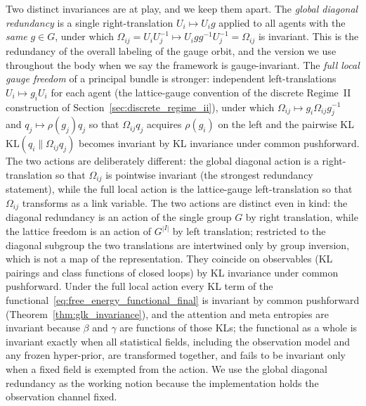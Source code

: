 \documentclass[11pt]{article}
\begin{document}
Two distinct invariances are at play, and we keep them apart. The \emph{global diagonal redundancy} is a single right-translation $U_i \mapsto U_i g$ applied to all agents with the \emph{same} $g \in G$, under which $\Omega_{ij} = U_i U_j^{-1} \mapsto U_i g g^{-1} U_j^{-1} = \Omega_{ij}$ is invariant. This is the redundancy of the overall labeling of the gauge orbit, and the version we use throughout the body when we say the framework is gauge-invariant. The \emph{full local gauge freedom} of a principal bundle is stronger: independent left-translations $U_i \mapsto g_i U_i$ for each agent (the lattice-gauge convention of the discrete Regime~II construction of Section~\ref{sec:discrete_regime_ii}), under which $\Omega_{ij} \mapsto g_i \Omega_{ij} g_j^{-1}$ and $q_j \mapsto \rho(g_j) q_j$ so that $\Omega_{ij} q_j$ acquires $\rho(g_i)$ on the left and the pairwise KL $\mathrm{KL}(q_i \| \Omega_{ij} q_j)$ becomes invariant by KL invariance under common pushforward. The two actions are deliberately different: the global diagonal action is a right-translation so that $\Omega_{ij}$ is pointwise invariant (the strongest redundancy statement), while the full local action is the lattice-gauge left-translation so that $\Omega_{ij}$ transforms as a link variable. The two actions are distinct even in kind: the diagonal redundancy is an action of the single group $G$ by right translation, while the lattice freedom is an action of $G^{|I|}$ by left translation; restricted to the diagonal subgroup the two translations are intertwined only by group inversion, which is not a map of the representation. They coincide on observables (KL pairings and class functions of closed loops) by KL invariance under common pushforward. Under the full local action every KL term of the functional~\eqref{eq:free_energy_functional_final} is invariant by common pushforward (Theorem~\ref{thm:glk_invariance}), and the attention and meta entropies are invariant because $\beta$ and $\gamma$ are functions of those KLs; the functional as a whole is invariant exactly when all statistical fields, including the observation model and any frozen hyper-prior, are transformed together, and fails to be invariant only when a fixed field is exempted from the action. We use the global diagonal redundancy as the working notion because the implementation holds the observation channel fixed.
\end{document}
